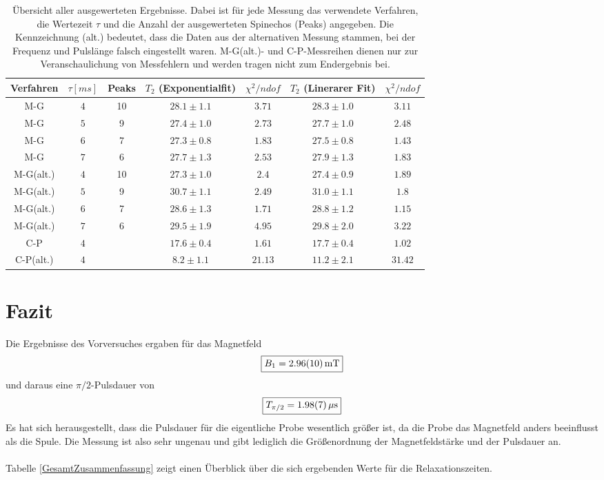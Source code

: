 \documentclass[12pt,a4paper]{article}
\begin{document}
\begin{table}
\begin{tabular}{|c|c|c||c|c||c|c|}
\hline
Verfahren & $\tau [ms]$ & Peaks &  $T_2$ (Exponentialfit) & $\chi^2/ndof$ &$T_2$ (Linerarer Fit) & $\chi^2/ndof$\\
\hline
M-G & $4$ & 10 & $ 28.1 \pm 1.1 $ & $ 3.71 $ & $ 28.3 \pm 1.0 $ & $ 3.11 $ \\
\hline
M-G & $5$ & 9 & $ 27.4 \pm 1.0 $ & $ 2.73 $ & $ 27.7 \pm 1.0 $ & $ 2.48 $ \\
\hline
M-G & $6$ & 7 & $ 27.3 \pm 0.8 $ & $ 1.83 $ & $ 27.5 \pm 0.8 $ & $ 1.43 $ \\
\hline
M-G & $7$ & 6 & $ 27.7 \pm 1.3 $ & $ 2.53 $ & $ 27.9 \pm 1.3 $ & $ 1.83 $ \\
\hline
\hline
M-G(alt.) & $4$ & 10 & $ 27.3 \pm 1.0 $ & $ 2.4 $ & $ 27.4 \pm 0.9 $ & $ 1.89 $ \\
\hline
M-G(alt.) & $5$ & 9 & $ 30.7 \pm 1.1 $ & $ 2.49 $ & $ 31.0 \pm 1.1 $ & $ 1.8 $ \\
\hline
M-G(alt.) & $6$ & 7 & $ 28.6 \pm 1.3 $ & $ 1.71 $ & $ 28.8 \pm 1.2 $ & $ 1.15 $ \\
\hline
M-G(alt.) & $7$ & 6 & $ 29.5 \pm 1.9 $ & $ 4.95 $ & $ 29.8 \pm 2.0 $ & $ 3.22 $ \\
\hline
\hline
C-P & $4$ &  & $17.6\pm 0.4$ & $1.61$ & $17.7\pm 0.4$ & $1.02$\\
\hline
C-P(alt.) & $4$ &  & $ 8.2 \pm 1.1 $ & $ 21.13 $ & $ 11.2 \pm 2.1 $ & $ 31.42 $ \\
\hline
\end{tabular}
\caption{Übersicht aller ausgewerteten Ergebnisse. Dabei ist für jede Messung das verwendete Verfahren, die Wertezeit $\tau$ und die Anzahl der ausgewerteten Spinechos (Peaks) angegeben. Die Kennzeichnung (alt.) bedeutet, dass die Daten aus der alternativen Messung stammen, bei der Frequenz und Pulslänge falsch eingestellt waren. M-G(alt.)- und C-P-Messreihen dienen nur zur Veranschaulichung von Messfehlern und werden tragen nicht zum Endergebnis bei.}
\label{T2zusammenfassung}
\end{table}

\section{Fazit}

Die Ergebnisse des Vorversuches ergaben für das Magnetfeld 
\begin{equation*}
\boxed{B_1 = \SI{2.96\pm 0.10}{mT}}
\end{equation*}
und daraus eine $\pi /2$-Pulsdauer von
\begin{equation*}
\boxed{T_{\pi /2} = \SI{1.98\pm 0.07}{\mu s}}
\end{equation*}
Es hat sich herausgestellt, dass die Pulsdauer für die eigentliche Probe wesentlich größer ist, da die Probe das Magnetfeld anders beeinflusst als die Spule. Die Messung ist also sehr ungenau und gibt lediglich die Größenordnung der Magnetfeldstärke und der Pulsdauer an.\\
\\
Tabelle \ref{GesamtZusammenfassung} zeigt einen Überblick über die sich ergebenden Werte für die Relaxationszeiten.
\end{document}
